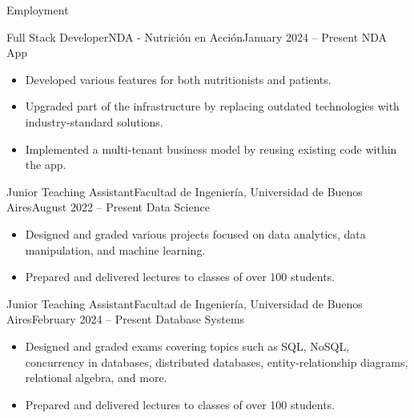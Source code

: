 \documentclass[]{mcdowellcv}
\begin{document}
	\makeheader
	
	\begin{cvsection}{Employment}
		\begin{cvsubsection}{Full Stack Developer}{NDA - Nutrición en Acción}{January 2024 -- Present}
			NDA App
			\begin{itemize}
				\item Developed various features for both nutritionists and patients.
				\item Upgraded part of the infrastructure by replacing outdated technologies with industry-standard solutions.
				\item Implemented a multi-tenant business model by reusing existing code within the app.
			\end{itemize}
		\end{cvsubsection}
		
		\begin{cvsubsection}{Junior Teaching Assistant}{Facultad de Ingeniería, Universidad de Buenos Aires}{August 2022 -- Present}
			Data Science
			\begin{itemize}
				\item Designed and graded various projects focused on data analytics, data manipulation, and machine learning.
				\item Prepared and delivered lectures to classes of over 100 students.
			\end{itemize}
		\end{cvsubsection}
		
		\begin{cvsubsection}{Junior Teaching Assistant}{Facultad de Ingeniería, Universidad de Buenos Aires}{February 2024 -- Present}
			Database Systems
			\begin{itemize}
				\item Designed and graded exams covering topics such as SQL, NoSQL, concurrency in databases, distributed databases, entity-relationship diagrams, relational algebra, and more.
				\item Prepared and delivered lectures to classes of over 100 students.
			\end{itemize}
		\end{cvsubsection}
	\end{cvsection}
	
\end{document}
